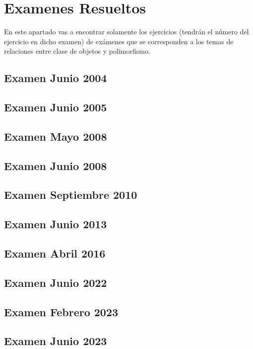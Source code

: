 \chapter{Examenes Resueltos}
En este apartado vas a encontrar solamente los ejercicios (tendrán el número del ejercicio en dicho examen) de exámenes que se corresponden a los temas de relaciones entre clase de objetos y polimorfismo.

\section{Examen Junio 2004}
  

\newpage
\section{Examen Junio 2005}
  
\newpage
\section{Examen Mayo 2008}
  
\newpage
\section{Examen Junio 2008}
  
\newpage
\section{Examen Septiembre 2010}
  
\newpage
\section{Examen Junio 2013}
  
\newpage
\section{Examen Abril 2016}
  
\newpage
\section{Examen Junio 2022}


\newpage
\section{Examen Febrero 2023}
  
\newpage
\section{Examen Junio 2023}
  
  